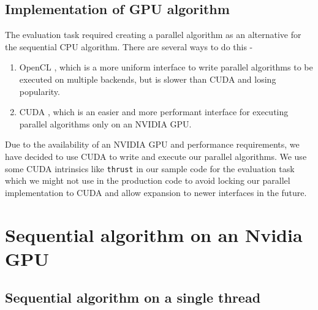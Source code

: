 \documentclass{article}
\begin{document}
\subsection{Implementation of GPU algorithm}

The evaluation task required creating a parallel algorithm as an alternative for the sequential CPU algorithm. There are several ways to do this -
\begin{enumerate}
    \item OpenCL \cite{opencl}, which is a more uniform interface to write parallel algorithms to be executed on multiple backends, but is slower than CUDA and losing popularity.
    \item CUDA \cite{cuda}, which is an easier and more performant interface for executing parallel algorithms only on an NVIDIA GPU.
\end{enumerate}
Due to the availability of an NVIDIA GPU and performance requirements, we have decided to use CUDA to write and execute our parallel algorithms.
\smallbreak
\noindent We use some CUDA intrinsics like \texttt{thrust} \cite{thrust} in our sample code for the evaluation task which we might not use in the production code to avoid locking our parallel implementation to CUDA and allow expansion to newer interfaces in the future.

\section{Sequential algorithm on an Nvidia GPU}

\subsection{Sequential algorithm on a single thread}
\end{document}
